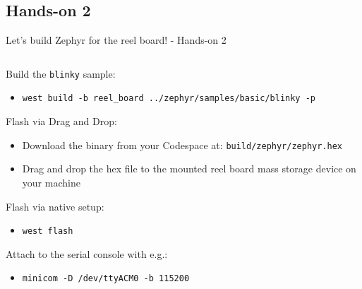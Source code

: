 \documentclass[10pt, aspectratio=169]{beamer}
\begin{document}
\subsection{Hands-on 2}
\begin{frame}[fragile]{Let's build Zephyr for the reel board! - Hands-on 2}
  \begin{columns}
    \begin{column}{0.6\textwidth}
       Build the \texttt{blinky} sample:
       \begin{itemize}
               \item \tiny\texttt{west build -b reel\_board ../zephyr/samples/basic/blinky -p}
       \end{itemize}

       Flash via Drag and Drop:
       \begin{itemize}
         \item \scriptsize{Download the binary from your Codespace at:} \scriptsize\texttt{build/zephyr/zephyr.hex}
         \item Drag and drop the hex file to the mounted reel board mass storage device on your machine
       \end{itemize}

       Flash via native setup:
       \begin{itemize}
         \item \scriptsize\texttt{west flash}
       \end{itemize}

       Attach to the serial console with e.g.:
       \begin{itemize}
         \item \scriptsize\texttt{minicom -D /dev/ttyACM0 -b 115200}
       \end{itemize}


\end{column}
\end{columns}
\end{frame}
\end{document}
